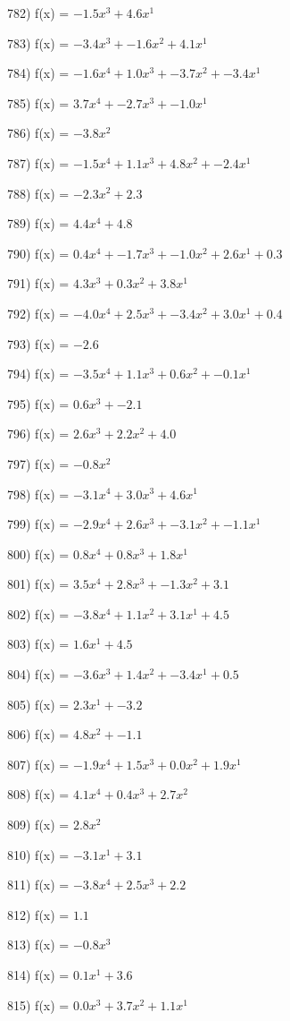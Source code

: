 \documentclass[10pt,a4paper]{article}
\begin{document}
782) f(x) = $-1.5x^3 + 4.6x^1$

783) f(x) = $-3.4x^3 + -1.6x^2 + 4.1x^1$

784) f(x) = $-1.6x^4 + 1.0x^3 + -3.7x^2 + -3.4x^1$

785) f(x) = $3.7x^4 + -2.7x^3 + -1.0x^1$

786) f(x) = $-3.8x^2$

787) f(x) = $-1.5x^4 + 1.1x^3 + 4.8x^2 + -2.4x^1$

788) f(x) = $-2.3x^2 + 2.3$

789) f(x) = $4.4x^4 + 4.8$

790) f(x) = $0.4x^4 + -1.7x^3 + -1.0x^2 + 2.6x^1 + 0.3$

791) f(x) = $4.3x^3 + 0.3x^2 + 3.8x^1$

792) f(x) = $-4.0x^4 + 2.5x^3 + -3.4x^2 + 3.0x^1 + 0.4$

793) f(x) = $-2.6$

794) f(x) = $-3.5x^4 + 1.1x^3 + 0.6x^2 + -0.1x^1$

795) f(x) = $0.6x^3 + -2.1$

796) f(x) = $2.6x^3 + 2.2x^2 + 4.0$

797) f(x) = $-0.8x^2$

798) f(x) = $-3.1x^4 + 3.0x^3 + 4.6x^1$

799) f(x) = $-2.9x^4 + 2.6x^3 + -3.1x^2 + -1.1x^1$

800) f(x) = $0.8x^4 + 0.8x^3 + 1.8x^1$

801) f(x) = $3.5x^4 + 2.8x^3 + -1.3x^2 + 3.1$

802) f(x) = $-3.8x^4 + 1.1x^2 + 3.1x^1 + 4.5$

803) f(x) = $1.6x^1 + 4.5$

804) f(x) = $-3.6x^3 + 1.4x^2 + -3.4x^1 + 0.5$

805) f(x) = $2.3x^1 + -3.2$

806) f(x) = $4.8x^2 + -1.1$

807) f(x) = $-1.9x^4 + 1.5x^3 + 0.0x^2 + 1.9x^1$

808) f(x) = $4.1x^4 + 0.4x^3 + 2.7x^2$

809) f(x) = $2.8x^2$

810) f(x) = $-3.1x^1 + 3.1$

811) f(x) = $-3.8x^4 + 2.5x^3 + 2.2$

812) f(x) = $1.1$

813) f(x) = $-0.8x^3$

814) f(x) = $0.1x^1 + 3.6$

815) f(x) = $0.0x^3 + 3.7x^2 + 1.1x^1$
\end{document}
